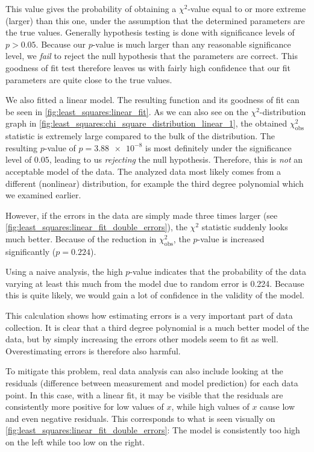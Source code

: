 This value gives the probability of obtaining a $\chi^2$-value equal to or more extreme (larger) than this one, under the assumption that the determined parameters are the true values. Generally hypothesis testing is done with significance levels of \( p > 0.05 \). Because our \( p \)-value is much larger than any reasonable significance level, we \emph{fail} to reject the null hypothesis that the parameters are correct. This goodness of fit test therefore leaves us with fairly high confidence that our fit parameters are quite close to the true values.

We also fitted a linear model. The resulting function and its goodness of fit can be seen in \autoref{fig:least_squares:linear_fit}. As we can also see on the $\chi^2$-distribution graph in \autoref{fig:least_squares:chi_square_distribution_linear_1}, the obtained $\chi^2_{\mathrm{obs}}$ statistic is extremely large compared to the bulk of the distribution. The resulting $p$-value of \( p = \num{3.88e-8} \) is most definitely under the significance level of $0.05$, leading to us \emph{rejecting} the null hypothesis. Therefore, this is \emph{not} an acceptable model of the data. The analyzed data most likely comes from a different (nonlinear) distribution, for example the third degree polynomial which we examined earlier.

However, if the errors in the data are simply made three times larger (see \autoref{fig:least_squares:linear_fit_double_errors}), the \( \chi^2 \) statistic suddenly looks much better. Because of the reduction in \( \chi^2_\mathrm{obs} \), the \( p \)-value is increased significantly (\( p = 0.224 \)).

Using a naive analysis, the high \( p \)-value indicates that the probability of the data varying at least this much from the model due to random error is \num{0.224}. Because this is quite likely, we would gain a lot of confidence in the validity of the model.

This calculation shows how estimating errors is a very important part of data collection. It is clear that a third degree polynomial is a much better model of the data, but by simply increasing the errors other models seem to fit as well. Overestimating errors is therefore also harmful.

To mitigate this problem, real data analysis can also include looking at the residuals (difference between measurement and model prediction) for each data point. In this case, with a linear fit, it may be visible that the residuals are consistently more positive for low values of \( x \), while high values of \( x \) cause low and even negative residuals. This corresponds to what is seen visually on \autoref{fig:least_squares:linear_fit_double_errors}: The model is consistently too high on the left while too low on the right.

